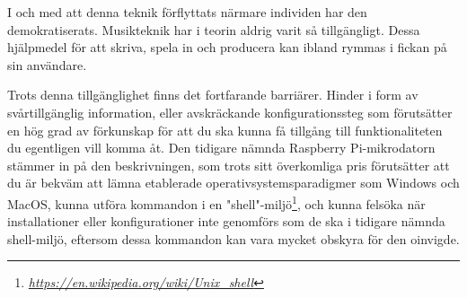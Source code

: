 \documentclass{article}
\begin{document}
I och med att denna teknik förflyttats närmare individen har den demokratiserats. Musikteknik har i teorin
aldrig varit så tillgängligt. Dessa hjälpmedel för att skriva, spela in och producera kan ibland rymmas i
fickan på sin användare.

Trots denna tillgänglighet finns det fortfarande barriärer. Hinder i form av svårtillgänglig information,
eller avskräckande konfigurationssteg som förutsätter en hög grad av förkunskap för att du ska kunna få
tillgång till funktionaliteten du egentligen vill komma åt. Den tidigare nämnda
Raspberry Pi-mikrodatorn stämmer in på den beskrivningen, som trots sitt överkomliga pris förutsätter att du
är bekväm att lämna etablerade operativsystemsparadigmer som Windows och MacOS, kunna utföra kommandon i en
"shell"-miljö\footnote{\emph{\url{https://en.wikipedia.org/wiki/Unix\_shell}}}, och kunna felsöka när installationer eller konfigurationer inte genomförs som de ska i tidigare
nämnda shell-miljö, eftersom dessa kommandon kan vara mycket obskyra för den oinvigde.
	
\end{document}
